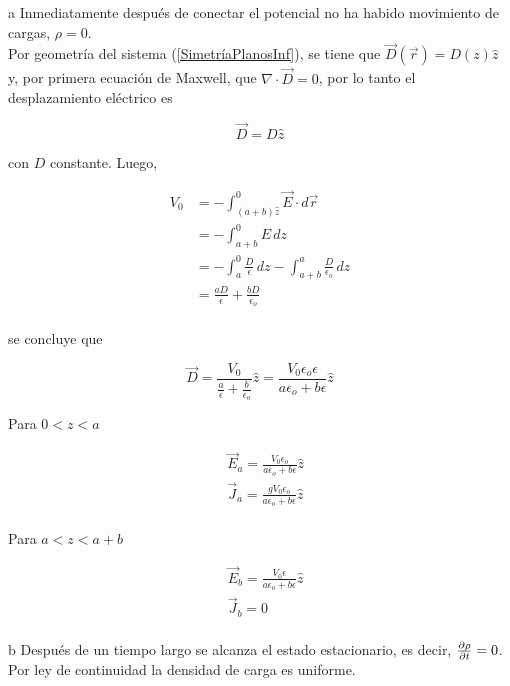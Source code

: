 \begin{solucion}{4}
\ics a
Inmediatamente después de conectar el potencial no ha habido movimiento de cargas, $\rho = 0$.\\

Por geometría del sistema (\ref{SimetríaPlanosInf}), se tiene que $\Vec{D}(\Vec{r})=D(z)\hat{z}$ y, por primera ecuación de Maxwell, que $\nabla\cdot\Vec{D}=0$, por lo tanto el desplazamiento eléctrico es

\[\Vec{D}=D\hat{z}\]

con $D$ constante. Luego,

\begin{equation}
\begin{split}
    V_0 &= -\int^0_{(a+b)\hat{z}}\Vec{E}\cdot d\Vec{r}\\
    &= -\int^0_{a+b}E\,dz\\
    &= -\int^0_a\frac{D}{\epsilon}\,dz
    -\int^a_{a+b}\frac{D}{\epsilon_o}\,dz\\
    &= \frac{aD}{\epsilon}+\frac{bD}{\epsilon_o}\\
\end{split}
\nonumber
\end{equation}

se concluye que

\[\Vec{D}=\frac{V_0}{\frac{a}{\epsilon}+\frac{b}{\epsilon_o}}\hat{z}
=\frac{V_0\epsilon_o\epsilon}{a\epsilon_o+b\epsilon}\hat{z}\]

Para $0<z<a$

\begin{equation}
\begin{split}
    &\Vec{E}_a=\frac{V_0\epsilon_o}{a\epsilon_o+b\epsilon}\hat{z}\\
    &\Vec{J}_a=\frac{gV_0\epsilon_o}{a\epsilon_o+b\epsilon}\hat{z}\\
\end{split}
\nonumber
\end{equation}

Para $a<z<a+b$

\begin{equation}
\begin{split}
    &\Vec{E}_b=\frac{V_0\epsilon}{a\epsilon_o+b\epsilon}\hat{z}\\
    &\Vec{J}_b=0\\
\end{split}
\nonumber
\end{equation}

\ics b
Después de un tiempo largo se alcanza el estado estacionario, es decir, $\frac{\partial \rho}{\partial t}=0$. Por ley de continuidad la densidad de carga es uniforme.\\


\end{solucion}
